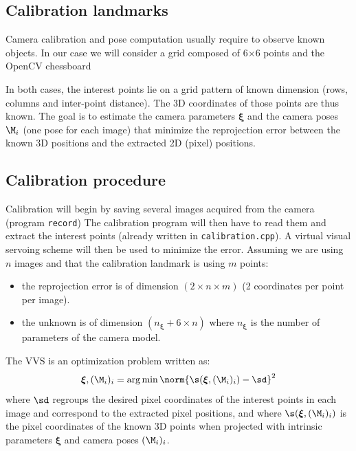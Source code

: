 \documentclass{ecnreport}
\begin{document}
\subsection{Calibration landmarks}

Camera calibration and pose computation usually require to observe known objects. In our case we will consider a grid composed of 6$\times$6 points and
the OpenCV chessboard
\newcommand{\xii}{{\boldsymbol{\xi}}}

In both cases, the interest points lie on a grid pattern of known dimension (rows, columns and inter-point distance). The 3D coordinates of those points
are thus known. The goal is to estimate the camera parameters $\xii$ and the camera poses $\M_i$ (one pose for each image) that minimize the reprojection error between the known 3D positions
and the extracted 2D (pixel) positions.

\subsection{Calibration procedure}
\label{sec:calib}

Calibration will begin by saving several images acquired from the camera (program \texttt{record}) The calibration program will then have to read them and extract the interest
points (already written in \texttt{calibration.cpp}). A virtual visual servoing scheme will then be used to minimize the error.
Assuming we are using $n$ images and that the calibration landmark is using $m$ points:
\begin{itemize}
 \item the reprojection error is of dimension $(2\times n\times m)$ (2 coordinates per point per image).
 \item the unknown is of dimension $(n_\xii + 6\times n)$ where $n_\xii$ is the number of parameters of the camera model.
\end{itemize}
The VVS is an optimization problem written as:
\begin{equation}\label{eq:calib}
 \xii, (\M_i)_i = \arg\min \norm{\s(\xii, (\M_i)_i) - \sd}^2
\end{equation}
where $\sd$ regroups the desired pixel coordinates of the interest points in each image and correspond to the extracted pixel positions, 
and where $\s(\xii, (\M_i)_i)$ is the pixel coordinates of the known 3D points when projected with intrinsic parameters $\xii$ and camera poses $(\M_i)_i$.
\end{document}
